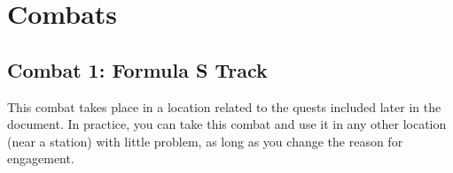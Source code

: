 \documentclass[a4paper]{article}
\begin{document}
\begin{comment}
\vspace{-0.5cm} \hspace{-18pt} \subsubsection{Blank Component 2} \label{blank_component2} \vspace{-0.2cm}
Component description
\\ \pbhw
{}
{}
{}
{}

\end{comment}


\newpage

\section{Combats}

\subsection{Combat 1: Formula S Track} \label{combat_1}

This combat takes place in a location related to the quests included later in the document. In practice, you can take this combat and use it in any other location (near a station) with little problem, as long as you change the reason for engagement.
\end{document}
